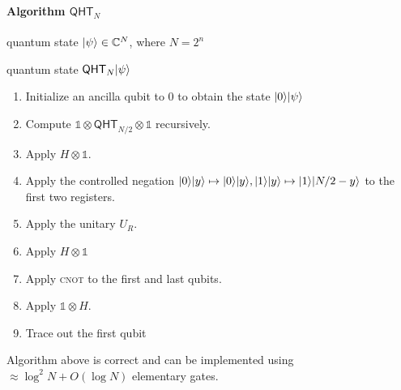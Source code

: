 \documentclass[12pt]{report}
\newcommand{\qht}{\mathsf{QHT}}
\begin{document}
\paragraph{Algorithm $\qht_N$}
    \label{alg:qht-N}
    \begin{description}[font = \normalfont\itshape, itemsep = 0mm, parsep = 0mm, topsep = 1mm]
        \item [Input:] quantum state $\lvert\psi\rangle \in \mathbb{C}^N$, where $N = 2^n$
        \item [Output:] quantum state $\qht_N\ket{\psi}$
    \end{description}

\begin{enumerate}%
    \item Initialize an ancilla qubit to $0$ to obtain the state $\lvert0\rangle\lvert\psi\rangle$
    \item Compute $\mathds{1} \otimes \qht_{N / 2} \otimes \mathds{1}$ recursively.
    \item Apply $H \otimes \mathds{1}$.
    \item\label{stp:ngt} Apply the controlled negation $\lvert0\rangle\lvert y\rangle \mapsto \lvert0\rangle\lvert y\rangle, \lvert1\rangle\lvert y\rangle \mapsto \lvert1\rangle\lvert N / 2 -y\rangle$ to the first two registers.
    \item Apply the unitary $U_R$.
    \item Apply $H \otimes \mathds{1}$
    \item Apply \textsc{cnot} to the first and last qubits.
    \item Apply $\mathds{1} \otimes H$.
    \item Trace out the first qubit
\end{enumerate}


\begin{theorem}
    \label{thm:qht-cost}
    Algorithm above is correct and can be implemented using $\approx \log^2 N + O(\log N)$ elementary gates.
\end{theorem}
\end{document}
